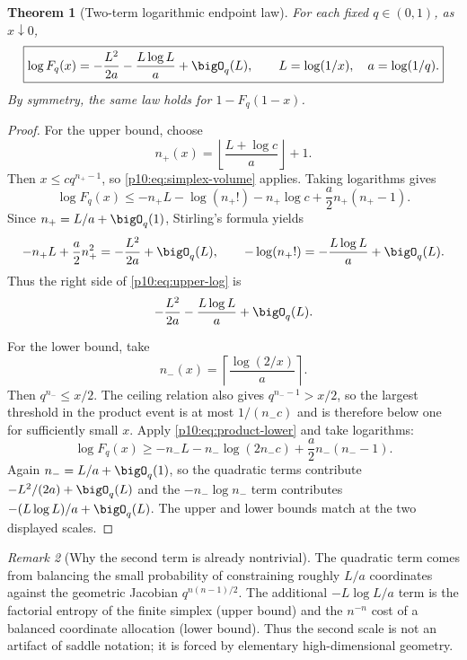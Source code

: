 \documentclass[11pt]{article}
\numberwithin{equation}{section}
\newtheorem{theorem}{Theorem}[section]
\theoremstyle{definition}
\theoremstyle{remark}
\newtheorem{remark}[theorem]{Remark}
\begin{document}
\begin{theorem}[Two-term logarithmic endpoint law]
\label{p10:thm:endpoint}
For each fixed $q\in(0,1)$, as $x\downarrow0$,
\begin{equation}
 \boxed{\displaystyle
 \log F_q(x)
 =-\frac{L^2}{2a}-\frac{L\log L}{a}+\bigO_q(L),
 \qquad L=\log(1/x),\quad a=\log(1/q).}                     \label{p10:eq:endpoint-main}
\end{equation}
By symmetry, the same law holds for $1-F_q(1-x)$.
\end{theorem}

\begin{proof}
For the upper bound, choose
\[
 n_+(x)=\left\lfloor\frac{L+\log c}{a}\right\rfloor+1.
\]
Then $x\le cq^{n_+-1}$, so \eqref{p10:eq:simplex-volume} applies.  Taking logarithms gives
\begin{equation}
 \log F_q(x)
 \le-n_+L-\log(n_+!)-n_+\log c+\frac{a}{2}n_+(n_+-1).       \label{p10:eq:upper-log}
\end{equation}
Since $n_+=L/a+\bigO_q(1)$, Stirling's formula yields
\[
 -n_+L+\frac{a}{2}n_+^2=-\frac{L^2}{2a}+\bigO_q(L),
 \qquad
 -\log(n_+!)=-\frac{L\log L}{a}+\bigO_q(L).
\]
Thus the right side of \eqref{p10:eq:upper-log} is
\[
 -\frac{L^2}{2a}-\frac{L\log L}{a}+\bigO_q(L).
\]

For the lower bound, take
\[
 n_-(x)=\left\lceil\frac{\log(2/x)}{a}\right\rceil.
\]
Then $q^{n_-}\le x/2$.  The ceiling relation also gives
$q^{n_--1}>x/2$, so the largest threshold in the product event is at most
$1/(n_-c)$ and is therefore below one for sufficiently small $x$.  Apply
\eqref{p10:eq:product-lower} and take logarithms:
\begin{equation}
 \log F_q(x)
 \ge-n_-L-n_-\log(2n_-c)+\frac{a}{2}n_-(n_--1).             \label{p10:eq:lower-log}
\end{equation}
Again $n_-=L/a+\bigO_q(1)$, so the quadratic terms contribute
$-L^2/(2a)+\bigO_q(L)$ and the $-n_-\log n_-$ term contributes
$-(L\log L)/a+\bigO_q(L)$.  The upper and lower bounds match at the two displayed scales.
\end{proof}

\begin{remark}[Why the second term is already nontrivial]
The quadratic term comes from balancing the small probability of constraining roughly
$L/a$ coordinates against the geometric Jacobian $q^{n(n-1)/2}$.  The additional
$-L\log L/a$ term is the factorial entropy of the finite simplex (upper bound) and the
$n^{-n}$ cost of a balanced coordinate allocation (lower bound).  Thus the second scale is
not an artifact of saddle notation; it is forced by elementary high-dimensional geometry.
\end{remark}
\end{document}
